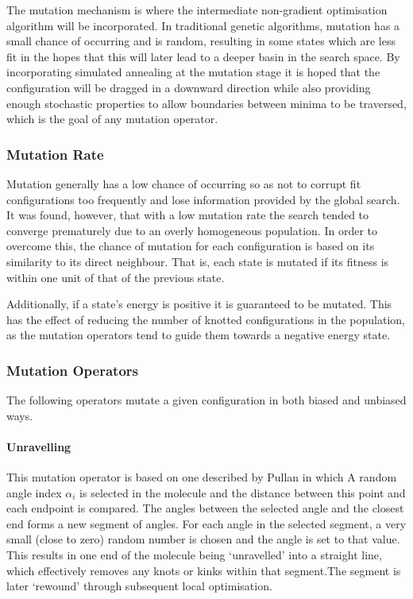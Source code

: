 \documentclass{article}
\begin{document}
The mutation mechanism is where the intermediate non-gradient optimisation
algorithm will be incorporated. In traditional genetic algorithms, mutation has
a small chance of occurring and is random, resulting in some states which are
less fit in the hopes that this will later lead to a deeper basin in the search
space. By incorporating simulated annealing at the mutation stage it is hoped
that the configuration will be dragged in a downward direction while also
providing enough stochastic properties to allow boundaries between minima to be
traversed, which is the goal of any mutation operator.

\subsubsection{Mutation Rate} \label{mutationrate}

Mutation generally has a low chance of occurring so as not to corrupt fit
configurations too frequently and lose information provided by the global
search. It was found, however, that with a low mutation rate the search tended
to converge prematurely due to an overly homogeneous population. In order to
overcome this, the chance of mutation for each configuration is based on its
similarity to its direct neighbour. That is, each state is mutated if its
fitness is within one unit of that of the previous state.

Additionally, if a state's energy is positive it is guaranteed to be mutated.
This has the effect of reducing the number of knotted configurations in the
population, as the mutation operators tend to guide them towards a negative
energy state.

\subsubsection{Mutation Operators}

The following operators mutate a given configuration in both biased and
unbiased ways.

\paragraph{Unravelling}

This mutation operator is based on one described by Pullan \cite{PULLAN1998331}
in which A random angle index $\alpha_i$ is selected in the molecule and the
distance between this point and each endpoint is compared. The angles between
the selected angle and the closest end forms a new segment of angles. For each
angle in the selected segment, a very small (close to zero) random number is
chosen and the angle is set to that value. This results in one end of the
molecule being `unravelled' into a straight line, which effectively removes any
knots or kinks within that segment.The segment is later `rewound' through
subsequent local optimisation.
\end{document}
